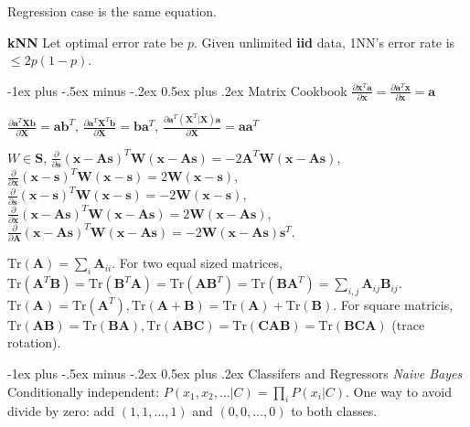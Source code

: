 \documentclass[10pt,landscape]{article}
\makeatletter
\newcommand{\vect}[1]{\boldsymbol{#1}}
\renewcommand{\section}{\@startsection{section}{1}{0mm}%
                                {-1ex plus -.5ex minus -.2ex}%
                                {0.5ex plus .2ex}%
                                {\normalfont\large\bfseries}}
\makeatother
\begin{document}
\begin{multicols}{3}
Regression case is the same equation.

\textbf{kNN} Let optimal error rate be $p$. Given unlimited \textbf{iid} data, 1NN's error rate is $\leq 2p(1-p)$.


\section{Matrix Cookbook}
$\frac{\partial \vect{x}^T \vect{a} }{\partial \vect{x}} = \frac{\partial \vect{a}^T \vect{x} }{\partial \vect{x}} = \vect{a}$

$\frac{\partial \vect{a}^T \vect{X} \vect{b}  }{\partial \vect{X}} = \vect{a}\vect{b}^T$, $\frac{\partial \vect{a}^T \vect{X}^T \vect{b}  }{\partial \vect{X}} = \vect{b}\vect{a}^T$, $\frac{\partial \vect{a}^T (\vect{X}^T|\vect{X}) \vect{a}  }{\partial \vect{X}} = \vect{a}\vect{a}^T$

$W \in \vect{S} $, 
$\frac{\partial}{\partial \vect{s} } (\vect{x} - \vect{A}\vect{s})^T \vect{W} (\vect{x} - \vect{A}\vect{s}) = -2\vect{A}^T \vect{W} (\vect{x} - \vect{A}\vect{s})$, 
$\frac{\partial}{\partial \vect{x} } (\vect{x} - \vect{s})^T \vect{W} (\vect{x} - \vect{s}) = 2 \vect{W} (\vect{x} - \vect{s})$, 
$\frac{\partial}{\partial \vect{s} } (\vect{x} - \vect{s})^T \vect{W} (\vect{x} - \vect{s}) = -2 \vect{W} (\vect{x} - \vect{s})$, 
$\frac{\partial}{\partial \vect{x} } (\vect{x} - \vect{A}\vect{s})^T \vect{W} (\vect{x} - \vect{A}\vect{s}) = 2\vect{W} (\vect{x} - \vect{A}\vect{s})$, 
$\frac{\partial}{\partial \vect{A} } (\vect{x} - \vect{A}\vect{s})^T \vect{W} (\vect{x} - \vect{A}\vect{s}) = -2 \vect{W} (\vect{x} - \vect{A}\vect{s})\vect{s}^T$.

$\mathrm{Tr}(\vect{A}) = \sum_i \vect{A}_{ii}$. For two equal sized matrices, $\mathrm{Tr}(\vect{A}^T \vect{B}) = \mathrm{Tr}(\vect{B}^T \vect{A}) = \mathrm{Tr}(\vect{A} \vect{B}^T) = \mathrm{Tr}(\vect{B} \vect{A}^T) = \sum_{i,j} \vect{A}_{ij} \vect{B}_{ij}$. $\mathrm{Tr}(\vect{A}) = \mathrm{Tr}(\vect{A}^T), \mathrm{Tr}(\vect{A}+\vect{B})=\mathrm{Tr}(\vect{A})+\mathrm{Tr}(\vect{B})$. For square matricis, $\mathrm{Tr}(\vect{A}\vect{B})=\mathrm{Tr}(\vect{B}\vect{A}), \mathrm{Tr}(\vect{A}\vect{B}\vect{C})=\mathrm{Tr}(\vect{C}\vect{A}\vect{B})=\mathrm{Tr}(\vect{B}\vect{C}\vect{A})$ (trace rotation).




\section{Classifers and Regressors}
\emph{Naive Bayes} Conditionally independent: $P(x_1,x_2,\ldots|C) = \prod_i P(x_i|C)$. One way to avoid divide by zero: add $(1,1,\ldots,1)$ and $(0,0,\ldots,0)$ to both classes. 


\end{multicols}
\end{document}
